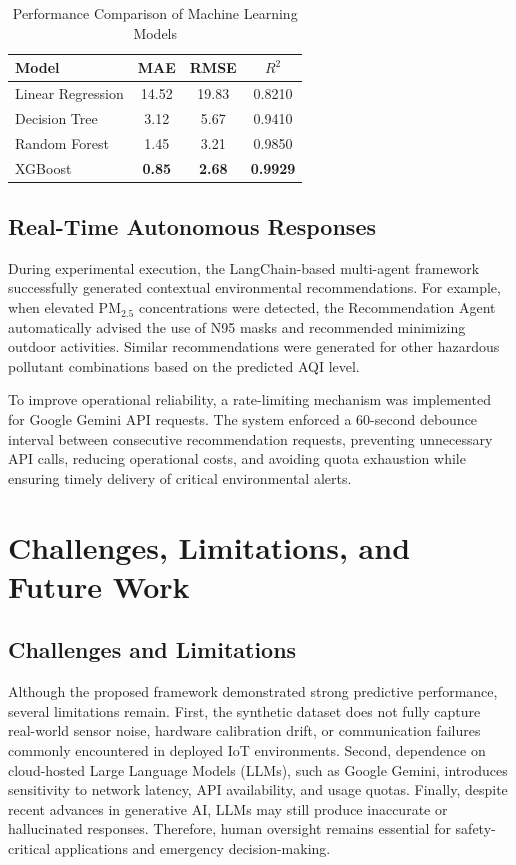 \documentclass[conference]{IEEEtran}
\begin{document}
\begin{table}[htbp]
\caption{Performance Comparison of Machine Learning Models}
\label{tab:model_comparison}
\centering
\begin{tabular}{lccc}
\hline
\textbf{Model} & \textbf{MAE} & \textbf{RMSE} & \textbf{$R^2$} \\
\hline
Linear Regression & 14.52 & 19.83 & 0.8210 \\
Decision Tree & 3.12 & 5.67 & 0.9410 \\
Random Forest & 1.45 & 3.21 & 0.9850 \\
XGBoost & \textbf{0.85} & \textbf{2.68} & \textbf{0.9929} \\
\hline
\end{tabular}
\end{table}

\subsection{Real-Time Autonomous Responses}

During experimental execution, the LangChain-based
multi-agent framework successfully generated contextual
environmental recommendations. For example, when
elevated PM$_{2.5}$ concentrations were detected, the
Recommendation Agent automatically advised the use of
N95 masks and recommended minimizing outdoor
activities. Similar recommendations were generated for
other hazardous pollutant combinations based on the
predicted AQI level.

To improve operational reliability, a rate-limiting mechanism
was implemented for Google Gemini API requests. The
system enforced a 60-second debounce interval between
consecutive recommendation requests, preventing
unnecessary API calls, reducing operational costs, and
avoiding quota exhaustion while ensuring timely delivery of
critical environmental alerts.

\section{Challenges, Limitations, and Future Work}

\subsection{Challenges and Limitations}

Although the proposed framework demonstrated strong
predictive performance, several limitations remain. First, the
synthetic dataset does not fully capture real-world sensor
noise, hardware calibration drift, or communication failures
commonly encountered in deployed IoT environments.
Second, dependence on cloud-hosted Large Language Models
(LLMs), such as Google Gemini, introduces sensitivity to
network latency, API availability, and usage quotas. Finally,
despite recent advances in generative AI, LLMs may still
produce inaccurate or hallucinated responses. Therefore,
human oversight remains essential for safety-critical
applications and emergency decision-making.
\end{document}

